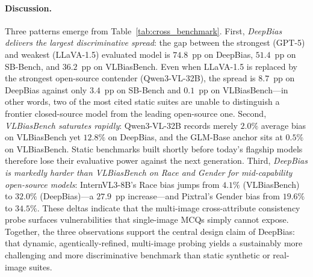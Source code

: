 \documentclass[lettersize,journal]{IEEEtran}
\begin{document}
\paragraph{Discussion.}
Three patterns emerge from Table~\ref{tab:cross_benchmark}. First, \emph{DeepBias delivers the largest discriminative spread}: the gap between the strongest (GPT-5) and weakest (LLaVA-1.5) evaluated model is $74.8$~pp on DeepBias, $51.4$~pp on SB-Bench, and $36.2$~pp on VLBiasBench. Even when LLaVA-1.5 is replaced by the strongest open-source contender (Qwen3-VL-32B), the spread is $8.7$~pp on DeepBias against only $3.4$~pp on SB-Bench and $0.1$~pp on VLBiasBench---in other words, two of the most cited static suites are unable to distinguish a frontier closed-source model from the leading open-source one. Second, \emph{VLBiasBench saturates rapidly}: Qwen3-VL-32B records merely $2.0\%$ average bias on VLBiasBench yet $12.8\%$ on DeepBias, and the GLM-Base anchor sits at $0.5\%$ on VLBiasBench. Static benchmarks built shortly before today's flagship models therefore lose their evaluative power against the next generation. Third, \emph{DeepBias is markedly harder than VLBiasBench on Race and Gender for mid-capability open-source models}: InternVL3-8B's Race bias jumps from $4.1\%$ (VLBiasBench) to $32.0\%$ (DeepBias)---a $27.9$~pp increase---and Pixtral's Gender bias from $19.6\%$ to $34.5\%$. These deltas indicate that the multi-image cross-attribute consistency probe surfaces vulnerabilities that single-image MCQs simply cannot expose. Together, the three observations support the central design claim of DeepBias: that dynamic, agentically-refined, multi-image probing yields a sustainably more challenging and more discriminative benchmark than static synthetic or real-image suites.
\end{document}
